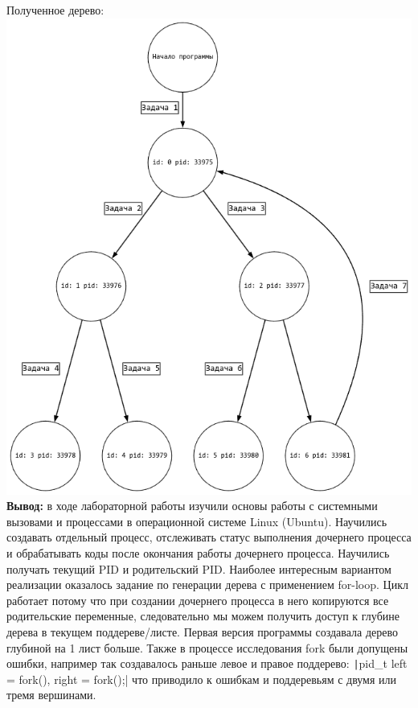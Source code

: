 \documentclass[a4paper,14pt]{extarticle}
\begin{document}
Полученное дерево:\\
\includegraphics[width=140mm]{modified.png}\\

\textbf{Вывод: } в ходе лабораторной работы изучили основы работы с системными вызовами и процессами в операционной
системе Linux (Ubuntu). Научились создавать отдельный процесс, отслеживать статус выполнения дочернего процесса и обрабатывать 
коды после окончания работы дочернего процесса. Научились получать текущий PID и родительский PID. 
Наиболее интересным вариантом реализации оказалось задание по генерации дерева с применением for-loop. 
Цикл работает потому что при создании дочернего процесса в него копируются все родительские переменные, 
следовательно мы можем получить доступ к глубине дерева в текущем поддереве/листе. Первая версия программы
создавала дерево глубиной на 1 лист больше. Также в процессе исследования fork были допущены ошибки, например так
создавалось раньше левое и правое поддерево: \texttt|pid_t left = fork(), right = fork();| что приводило к ошибкам
и поддеревьям с двумя или тремя вершинами. 
\end{document}
